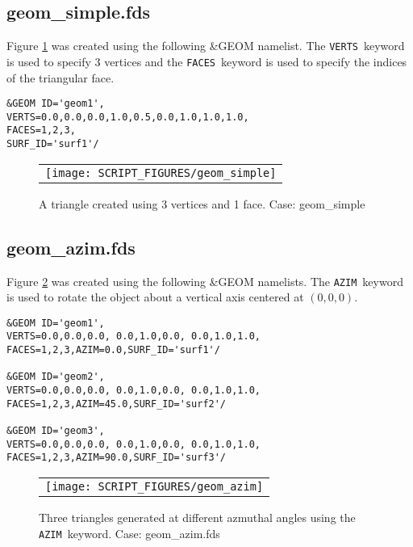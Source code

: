 \documentclass[12pt]{article}
\begin{document}
\subsection{geom\_simple.fds}
Figure \ref{fig:geom_simple} was created using the following \&GEOM namelist.
The {\tt VERTS}\ keyword is used to specify 3 vertices and the {\tt FACES}\ keyword
is used to specify the indices of the triangular face.

{\scriptsize
\begin{verbatim}
&GEOM ID='geom1',
VERTS=0.0,0.0,0.0,1.0,0.5,0.0,1.0,1.0,1.0,
FACES=1,2,3,
SURF_ID='surf1'/
\end{verbatim}
}

\begin{figure}[\figoptions]
\begin{center}
\begin{tabular}{c}
 \texttt{[image: SCRIPT\_FIGURES/geom\_simple]}
  \end{tabular}
\end{center}
 \caption{A triangle created using 3 vertices and 1 face. Case: geom\_simple}
\label{fig:geom_simple}
\end{figure}

\subsection{geom\_azim.fds}
Figure \ref{fig:geom_azim} was created using the following \&GEOM namelists.
The {\tt AZIM}\ keyword is used to rotate the object about a vertical axis
centered at $(0,0,0)$.

{\scriptsize
\begin{verbatim}
&GEOM ID='geom1',
VERTS=0.0,0.0,0.0, 0.0,1.0,0.0, 0.0,1.0,1.0,
FACES=1,2,3,AZIM=0.0,SURF_ID='surf1'/

&GEOM ID='geom2',
VERTS=0.0,0.0,0.0, 0.0,1.0,0.0, 0.0,1.0,1.0,
FACES=1,2,3,AZIM=45.0,SURF_ID='surf2'/

&GEOM ID='geom3',
VERTS=0.0,0.0,0.0, 0.0,1.0,0.0, 0.0,1.0,1.0,
FACES=1,2,3,AZIM=90.0,SURF_ID='surf3'/
\end{verbatim}
}

\begin{figure}[\figoptions]
\begin{center}
\begin{tabular}{c}
 \texttt{[image: SCRIPT\_FIGURES/geom\_azim]}
  \end{tabular}
\end{center}
 \caption{Three triangles generated at different azmuthal angles using the {\tt AZIM}\ keyword. Case: geom\_azim.fds}
\label{fig:geom_azim}
\end{figure}
\end{document}
